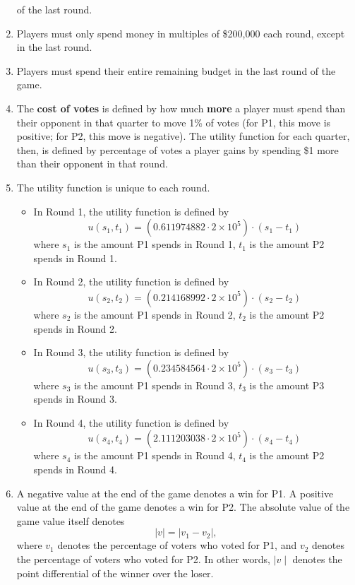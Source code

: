 \documentclass[11pt]{article}
\begin{document}
\begin{enumerate}
of the last round.
\item Players must only spend money in multiples of \$200,000 each round,
except in the last round.
\item Players must spend their entire remaining budget in the last round
of the game.
\item The \textbf{cost of votes} is defined by how much \textbf{more} a
player must spend than their opponent in that quarter to move 1\% of
votes (for P1, this move is positive; for P2, this move is
negative). The utility function for each quarter, then, is defined by
percentage of votes a player gains by spending \$1 more than
their opponent in that round.
\item The utility function is unique to each round.
\begin{itemize}
\item In Round 1, the utility function is defined by
\begin{equation*}
u(s_1,t_1) = (0.611974882 \cdot 2 \times 10^5) \cdot(s_1-t_1)
\end{equation*}
where $s_1$ is the amount P1 spends in Round 1, $t_1$ is the
amount P2 spends in Round 1.
\item In Round 2, the utility function is defined by
\begin{equation*}
u(s_2,t_2) = (0.214168992 \cdot 2 \times 10^5) \cdot(s_2-t_2) 
\end{equation*}
where $s_2$ is the amount P1 spends in Round 2, $t_2$ is the
amount P2 spends in Round 2.
\item In Round 3, the utility function is defined by
\begin{equation*}
u(s_3,t_3) = (0.234584564 \cdot 2 \times 10^5) \cdot (s_3-t_3)
\end{equation*}
where $s_3$ is the amount P1 spends in Round 3, $t_3$ is the
amount P3 spends in Round 3.
\item In Round 4, the utility function is defined by
\begin{equation*}
u(s_4,t_4) = (2.111203038 \cdot 2 \times 10^5) \cdot(s_4-t_4)
\end{equation*}
where $s_4$ is the amount P1 spends in Round 4, $t_4$ is the
amount P2 spends in Round 4.
\end{itemize}
\item A negative value at the end of the game denotes a win for P1. A
positive value at the end of the game denotes a win for P2. The absolute value of the game value itself denotes
\begin{equation*}
\mid v \mid = \mid v_1 - v_2 \mid,
\end{equation*}
where $v_1$ denotes the percentage of voters who voted for P1, and $v_2$ denotes the percentage of voters who voted for P2. In other words, $\mid v \mid$ denotes the point differential of the winner over the loser.
\end{enumerate}
\end{document}
